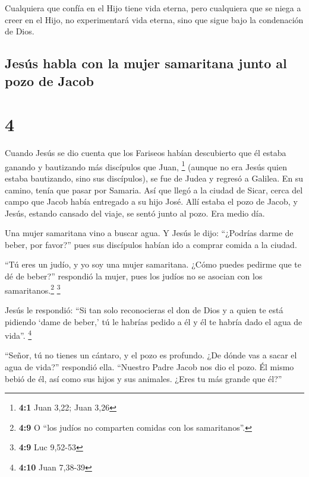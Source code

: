  Cualquiera que confía en el Hijo tiene vida eterna, pero
cualquiera que se niega a creer en el Hijo, no experimentará vida
eterna, sino que sigue bajo la condenación de Dios.

\hypertarget{jesuxfas-habla-con-la-mujer-samaritana-junto-al-pozo-de-jacob}{%
\subsection{Jesús habla con la mujer samaritana junto al pozo de
Jacob}\label{jesuxfas-habla-con-la-mujer-samaritana-junto-al-pozo-de-jacob}}

\hypertarget{section-3}{%
\section{4}\label{section-3}}

 Cuando Jesús se dio cuenta que los Fariseos habían
descubierto que él estaba ganando y bautizando más discípulos que Juan,
\footnote{\textbf{4:1} Juan 3,22; Juan 3,26}  (aunque no
era Jesús quien estaba bautizando, sino sus discípulos), 
se fue de Judea y regresó a Galilea.  En su camino, tenía
que pasar por Samaria.  Así que llegó a la ciudad de
Sicar, cerca del campo que Jacob había entregado a su hijo José.
 Allí estaba el pozo de Jacob, y Jesús, estando cansado
del viaje, se sentó junto al pozo. Era medio día.

 Una mujer samaritana vino a buscar agua. Y Jesús le dijo:
``¿Podrías darme de beber, por favor?''  pues sus
discípulos habían ido a comprar comida a la ciudad.

 ``Tú eres un judío, y yo soy una mujer samaritana. ¿Cómo
puedes pedirme que te dé de beber?'' respondió la mujer, pues los judíos
no se asocian con los samaritanos.\footnote{\textbf{4:9} O ``los judíos
  no comparten comidas con los samaritanos''.} \footnote{\textbf{4:9}
  Luc 9,52-53}

 Jesús le respondió: ``Si tan solo reconocieras el don de
Dios y a quien te está pidiendo `dame de beber,' tú le habrías pedido a
él y él te habría dado el agua de vida''. \footnote{\textbf{4:10} Juan
  7,38-39}

 ``Señor, tú no tienes un cántaro, y el pozo es profundo.
¿De dónde vas a sacar el agua de vida?'' respondió ella. 
``Nuestro Padre Jacob nos dio el pozo. Él mismo bebió de él, así como
sus hijos y sus animales. ¿Eres tu más grande que él?''

